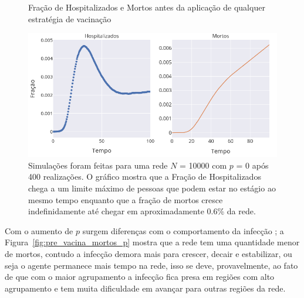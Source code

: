 \begin{figure}[H]
    \centering
    \captionsetup{font=normalsize,skip=0.8pt,singlelinecheck=on,labelsep=endash}
    \caption{Fração de Hospitalizados e Mortos antes da aplicação de qualquer estratégia de vacinação}
    \includegraphics[scale= 0.5]{figuras/pre_vacina_mortos_nponderado.png}
    \captionsetup{font=small,justification=justified}
    \caption*{Simulações foram feitas para uma rede $N$ = 10000 com $p $ = 0 após 400 realizações. O gráfico mostra que a Fração de Hospitalizados chega a um limite máximo de pessoas que podem estar no estágio ao mesmo tempo enquanto que a fração de mortos cresce indefinidamente até chegar em aproximadamente 0.6\% da rede.}
    \label{fig:pre_vacina_mortos}
\end{figure}

Com o aumento de $p$ surgem diferenças com o comportamento da infecção
; a Figura~\ref{fig:pre_vacina_mortos_p} mostra 
que a rede tem uma quantidade menor de mortos, contudo a infecção demora mais para crescer, decair e estabilizar, ou seja o agente permanece mais tempo na rede, isso se deve, provavelmente, ao fato de que com o maior agrupamento a infecção fica presa em regiões com alto agrupamento e tem muita dificuldade em avançar para outras regiões da rede.

